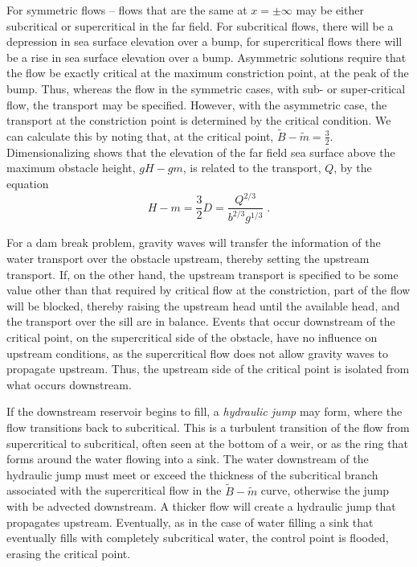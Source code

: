 \documentclass[11pt]{report}
\numberwithin{equation}{section}
\begin{document}
For symmetric flows -- flows that are the same at $x=\pm\infty$ may be either subcritical or supercritical in the far field.  For subcritical flows, there will be a depression in sea surface elevation over a bump, for supercritical flows there will be a rise in sea surface elevation over a bump.  Asymmetric solutions require that the flow be exactly critical at the maximum constriction point, at the peak of the bump.  Thus, whereas the flow in the symmetric cases, with sub- or super-critical flow, the transport may be specified.  However, with the asymmetric case, the transport at the constriction point is determined by the critical condition.  We can calculate this by noting that, at the critical point, $\tilde{B} - \tilde{m} = \frac{3}{2}$.  Dimensionalizing shows that the elevation of the far field sea surface above the maximum obstacle height, $g H - g m$, is related to the transport, $Q$, by the equation
\begin{equation}
    H - m = \frac{3}{2} D = \frac{Q^{2/3}}{b^{2/3} g^{1/3}} \; .
\end{equation}

For a dam break problem, gravity waves will transfer the information of the water transport over the obstacle upstream, thereby setting the upstream transport.  If, on the other hand, the upstream transport is specified to be some value other than that required by critical flow at the constriction, part of the flow will be blocked, thereby raising the upstream head until the available head, and the transport over the sill are in balance.  Events that occur downstream of the critical point, on the supercritical side of the obstacle, have no influence on upstream conditions, as the supercritical flow does not allow gravity waves to propagate upstream.  Thus, the upstream side of the critical point is isolated from what occurs downstream.

If the downstream reservoir begins to fill, a \emph{hydraulic jump} may form, where the flow transitions back to subcritical.  This is a turbulent transition of the flow from supercritical to subcritical, often seen at the bottom of a weir, or as the ring that forms around the water flowing into a sink.  The water downstream of the hydraulic jump must meet or exceed the thickness of the subcritical branch associated with the supercritical flow in the $\tilde{B} - \tilde{m}$ curve, otherwise the jump with be advected downstream.  A thicker flow will create a hydraulic jump that propagates upstream.  Eventually, as in the case of water filling a sink that eventually fills with completely subcritical water, the control point is flooded, erasing the critical point.
\end{document}
